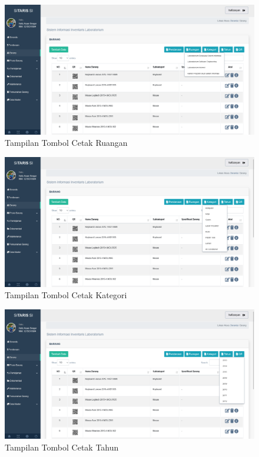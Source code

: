 \begin{enumerate}
        \begin{figure}
          \centering
          \includegraphics[width=0.82\linewidth]{konten//gambar/barang cetak ruangan.png}
          \caption{Tampilan Tombol Cetak Ruangan}
          \label{fig:enter-label}
        \end{figure}

        \begin{figure}
          \centering
          \includegraphics[width=0.82\linewidth]{konten//gambar/barang cetak kategori.png}
          \caption{Tampilan Tombol Cetak Kategori}
          \label{fig:enter-label}
        \end{figure}

        \begin{figure}
          \centering
          \includegraphics[width=0.82\linewidth]{konten//gambar/barang cetak tahun.png}
          \caption{Tampilan Tombol Cetak Tahun}
          \label{fig:enter-label}
        \end{figure}


\end{enumerate}
